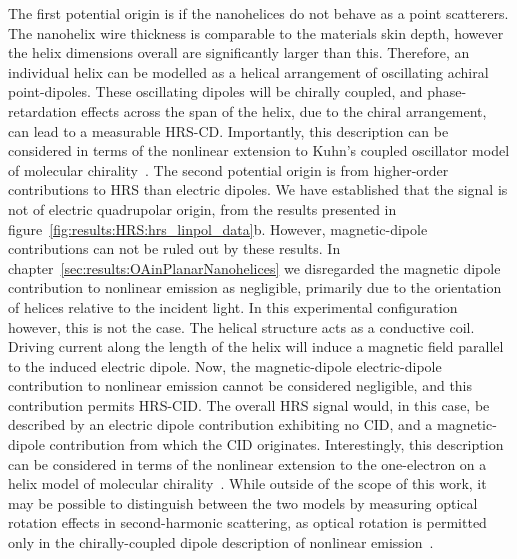 The first potential origin is if the nanohelices do not behave as a point scatterers.
The nanohelix wire thickness is comparable to the materials skin depth, however the helix dimensions overall are significantly larger than this. Therefore, an individual helix can be modelled as a helical arrangement of oscillating achiral point-dipoles. These oscillating dipoles will be chirally coupled, and phase-retardation effects across the span of the helix, due to the chiral arrangement, can lead to a measurable HRS-CD.
Importantly, this description can be considered in terms of the nonlinear extension to Kuhn's coupled oscillator model of molecular chirality~\cite{Fischer2005a}.
The second potential origin is from higher-order contributions to HRS than electric dipoles. We have established that the signal is not of electric quadrupolar origin, from the results presented in figure~\ref{fig:results:HRS:hrs_linpol_data}b. However, magnetic-dipole contributions can not be ruled out by these results. 
In chapter~\ref{sec:results:OAinPlanarNanohelices} we disregarded the magnetic dipole contribution to nonlinear emission as negligible, primarily due to the orientation of helices relative to the incident light. In this experimental configuration however, this is not the case.
The helical structure acts as a conductive coil. Driving current along the length of the helix will induce a magnetic field parallel to the induced electric dipole. Now, the magnetic-dipole electric-dipole contribution to nonlinear emission cannot be considered negligible, and this contribution permits HRS-CID. The overall HRS signal would, in this case, be described by an electric dipole contribution exhibiting no CID, and a magnetic-dipole contribution from which the CID originates.
Interestingly, this description can be considered in terms of the nonlinear extension to the one-electron on a helix model of molecular chirality~\cite{Fischer2005a}.
While outside of the scope of this work, it may be possible to distinguish between the two models by measuring optical rotation effects in second-harmonic scattering, as optical rotation is permitted only in the chirally-coupled dipole description of nonlinear emission~\cite{Fischer2005a}.

